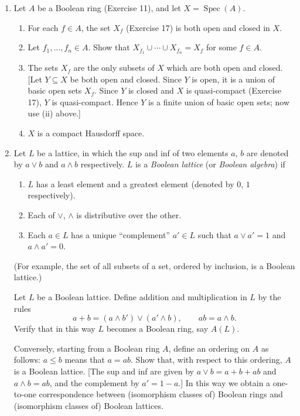 \begin{enumerate}
\item Let $A$ be a Boolean ring (Exercise 11), and let $X=\operatorname{Spec}(A)$.
\begin{enumerate}
\renewcommand{\labelenumii}{\roman{enumii})}
\item For each $f\in A$, the set $X_f$ (Exercise 17) is both open and closed in $X$.
\item Let $f_1,\ldots,f_n\in A$. Show that $X_{f_1}\cup\cdots\cup X_{f_n}=X_f$ for some $f\in A$.
\item The sets $X_f$ are the only subsets of $X$ which are both open and closed. [Let $Y\subseteq X$ be both open and closed. Since $Y$ is open, it is a union of basic open sets $X_f$. Since $Y$ is closed and $X$ is quasi-compact (Exercise 17), $Y$ is quasi-compact. Hence $Y$ is a finite union of basic open sets; now use (ii) above.]
\item $X$ is a compact Hausdorff space.
\end{enumerate}

\item Let $L$ be a lattice, in which the sup and inf of two elements $a$, $b$ are denoted by $a\vee b$ and $a\wedge b$ respectively. $L$ is a \textit{Boolean lattice} (or \textit{Boolean algebra}) if
\begin{enumerate}
\renewcommand{\labelenumii}{\roman{enumii})}
\item $L$ has a least element and a greatest element (denoted by $0$, $1$ respectively).
\item Each of $\vee$, $\wedge$ is distributive over the other.
\item Each $a\in L$ has a unique ``complement'' $a'\in L$ such that $a\vee a'=1$ and $a\wedge a'=0$.
\end{enumerate}
(For example, the set of all subsets of a set, ordered by inclusion, is a Boolean lattice.)

Let $L$ be a Boolean lattice. Define addition and multiplication in $L$ by the rules
\[
 a+b=(a\wedge b')\vee(a'\wedge b),\qquad ab=a\wedge b.
\]
Verify that in this way $L$ becomes a Boolean ring, say $A(L)$.

Conversely, starting from a Boolean ring $A$, define an ordering on $A$ as follows: $a\leq b$ means that $a=ab$. Show that, with respect to this ordering, $A$ is a Boolean lattice. [The sup and inf are given by $a\vee b=a+b+ab$ and $a\wedge b=ab$, and the complement by $a'=1-a$.] In this way we obtain a one-to-one correspondence between (isomorphism classes of) Boolean rings and (isomorphism classes of) Boolean lattices.


\end{enumerate}
